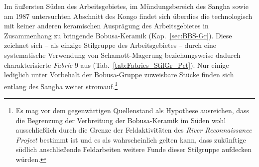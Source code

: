 Im äußersten Süden des Arbeitsgebietes, im Mündungsbereich des \mbox{Sangha} sowie am 1987 untersuchten Abschnitt des Kongo findet sich überdies die technologisch mit keiner anderen keramischen Ausprägung des Arbeitsgebietes in Zusammenhang zu bringende Bobusa-Keramik (Kap.~\ref{sec:BBS-Gr}). Diese zeichnet sich -- als einzige Stilgruppe des Arbeitsgebietes -- durch eine systematische Verwendung von Schamott-Magerung beziehungsweise dadurch charakterisierte \textit{Fabric} 9 aus (Tab.~\ref{tab:Fabrics_StilGr_Pct}). Nur einige lediglich unter Vorbehalt der Bobusa-Gruppe zuweisbare Stücke finden sich entlang des \mbox{Sangha} weiter stromauf.\footnote{Es mag vor dem gegenwärtigen Quellenstand als Hypothese ausreichen, dass die Begrenzung der Verbreitung der Bobusa-Keramik im Süden wohl ausschließlich durch die Grenze der Feldaktivitäten des \textit{River Reconnaissance Project} bestimmt ist und es als wahrscheinlich gelten kann, dass zukünftige südlich anschließende Feldarbeiten weitere Funde dieser Stilgruppe aufdecken würden.}